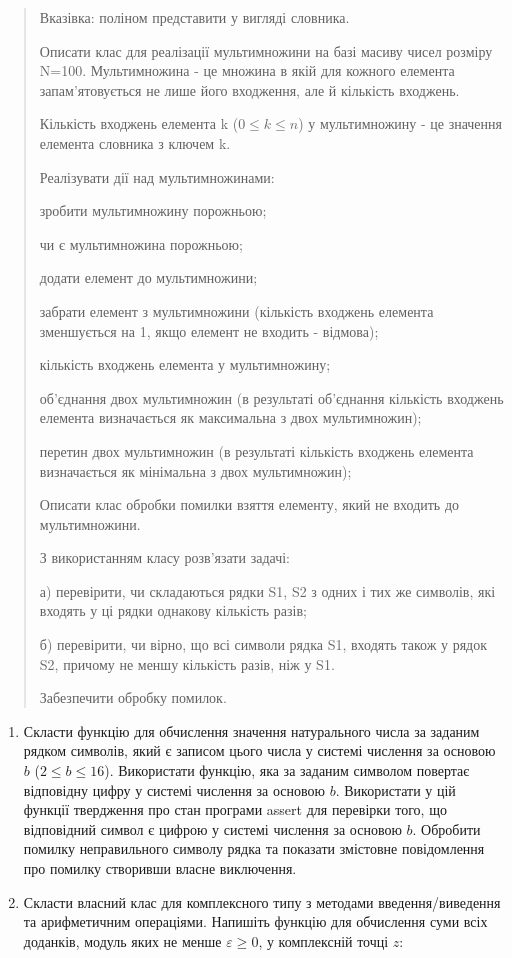 \documentclass[]{article}
\begin{document}
\begin{quote}
Вказівка: поліном представити у вигляді словника.

Описати клас для реалізації мультимножини на базі масиву чисел розміру
N=100. Мультимножина - це множина в якій для кожного елемента
запам'ятовується не лише його входження, але й кількість входжень.

Кількість входжень елемента k (\(0 \leq k \leq n\)) у мультимножину - це
значення елемента словника з ключем k.

Реалізувати дії над мультимножинами:

зробити мультимножину порожньою;

чи є мультимножина порожньою;

додати елемент до мультимножини;

забрати елемент з мультимножини (кількість входжень елемента зменшується
на 1, якщо елемент не входить - відмова);

кількість входжень елемента у мультимножину;

об'єднання двох мультимножин (в результаті об'єднання кількість входжень
елемента визначається як максимальна з двох мультимножин);

перетин двох мультимножин (в результаті кількість входжень елемента
визначається як мінімальна з двох мультимножин);

Описати клас обробки помилки взяття елементу, який не входить до
мультимножини.

З використанням класу розв'язати задачі:

а) перевірити, чи складаються рядки S1, S2 з одних і тих же символів,
які входять у ці рядки однакову кількість разів;

б) перевірити, чи вірно, що всі символи рядка S1, входять також у рядок
S2, причому не меншу кількість разів, ніж у S1.

Забезпечити обробку помилок.
\end{quote}

\begin{enumerate}
\def\labelenumi{\arabic{enumi}.}
\item
  Скласти функцію для обчислення значення натурального числа за заданим
  рядком символів, який є записом цього числа у системі числення за
  основою \(b\) (\(2 \leq b \leq 16\)). Використати функцію, яка за
  заданим символом повертає відповідну цифру у системі числення за
  основою \(b\). Використати у цій функції твердження про стан програми
  assert для перевірки того, що відповідний символ є цифрою у системі
  числення за основою \(b\). Обробити помилку неправильного символу
  рядка та показати змістовне повідомлення про помилку створивши власне
  виключення.
\item
  Скласти власний клас для комплексного типу з методами
  введення/виведення та арифметичним операціями. Напишіть функцію для
  обчислення суми всіх доданків, модуль яких не менше
  \(\varepsilon \geq 0\), у комплексній точці \(z\):
\end{enumerate}
\end{document}
